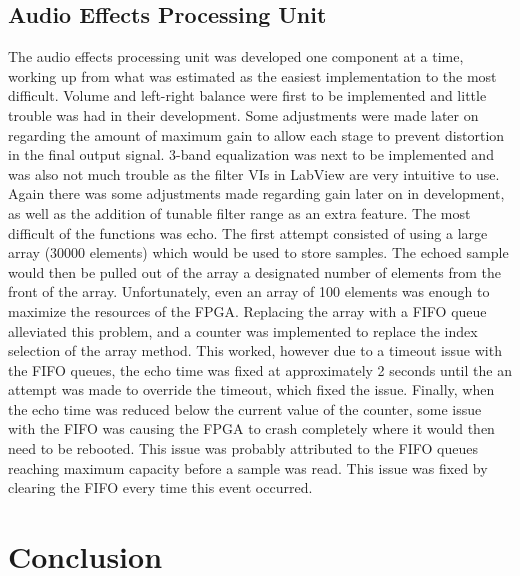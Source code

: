 \subsection{Audio Effects Processing Unit}
The audio effects processing unit was developed one component at a time, working up from what was estimated as the easiest implementation to the most difficult. 
Volume and left-right balance were first to be implemented and little trouble was had in their development. Some adjustments were made later on regarding the amount of maximum gain to allow each stage to prevent distortion in the final output signal. 
3-band equalization was next to be implemented and was also not much trouble as the filter VIs in LabView are very intuitive to use.
 Again there was some adjustments made regarding gain later on in development, as well as the addition of tunable filter range as an extra feature. 
The most difficult of the functions was echo. 
The first attempt consisted of using a large array (30000 elements) which would be used to store samples. 
The echoed sample would then be pulled out of the array a designated number of elements from the front of the array. Unfortunately, even an array of 100 elements was enough to maximize the resources of the FPGA. 
Replacing the array with a FIFO queue alleviated this problem, and a counter was implemented to replace the index selection of the array method. 
This worked, however due to a timeout issue with the FIFO queues, the echo time was fixed at approximately 2 seconds until the an attempt was made to override the timeout, which fixed the issue. 
Finally, when the echo time was reduced below the current value of the counter, some issue with the FIFO was causing the FPGA to crash completely where it would then need to be rebooted. 
This issue was probably attributed to the FIFO queues reaching maximum capacity before a sample was read. 
This issue was fixed by clearing the FIFO every time this event occurred. 


\section{Conclusion}



